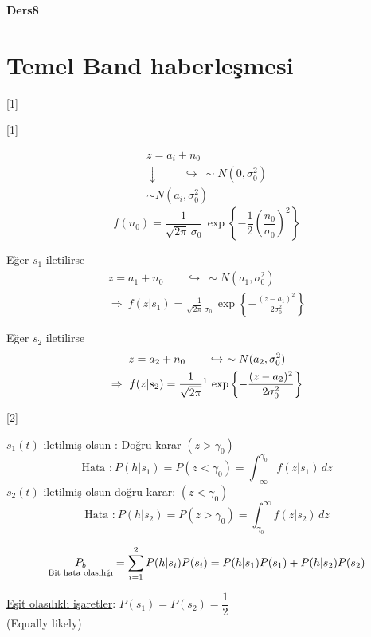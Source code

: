\documentclass[11pt,a4paper]{article}
\begin{document}

\textbf{Ders8}

\section{Temel Band haberleşmesi}
[1]

[1]

\[
\begin{array}{l}
z = a_i + n_0 \\
\downarrow \qquad\ \hookrightarrow\ \sim N(0,\sigma_0^2) \\
\sim N(a_i,\sigma_0^2)
\end{array}
\]
\[ f(n_0) = \frac{1}{\sqrt{2\pi}\,\sigma_0}\,\exp\left\{-\frac{1}{2}\left(\frac{n_0}{\sigma_0}\right)^2\right\} \]

Eğer $s_1$ iletilirse
\[
\begin{gathered}
z = a_1 + n_0 \qquad \hookrightarrow\ \sim N(a_1,\sigma_0^2) \\
\Rightarrow\ f(z|s_1)=\frac{1}{\sqrt{2\pi}\,\sigma_0}\,\exp\left\{-\frac{(z-a_1)^2}{2\sigma_0^2}\right\}
\end{gathered}
\]

Eğer $s_2$ iletilirse
\[
\begin{gathered}
z = a_2 + n_0 \qquad \hookrightarrow\ \sim N(a_2,\sigma_0^2) \\
\Rightarrow\ f(z|s_2)=\frac{1}{\sqrt{2\pi}}\footnotemark\,\exp\left\{-\frac{(z-a_2)^2}{2\sigma_0^2}\right\}
\end{gathered}
\]

[2]

$s_1(t)$ iletilmiş olsun : Doğru karar $(z>\gamma_0)$
\[ \text{Hata :}\ P(h|s_1)=P(z<\gamma_0)=\int_{-\infty}^{\gamma_0} f(z|s_1)\,dz \]
$s_2(t)$ iletilmiş olsun doğru karar: $(z<\gamma_0)$
\[ \text{Hata :}\ P(h|s_2)=P(z>\gamma_0)=\int_{\gamma_0}^{\infty} f(z|s_2)\,dz \]

\[ \underset{\text{\scriptsize Bit hata olasılığı}}{P_b}=\sum_{i=1}^{2}P(h|s_i)P(s_i)=P(h|s_1)P(s_1)+P(h|s_2)P(s_2) \]

\underline{Eşit olasılıklı işaretler}: $P(s_1)=P(s_2)=\dfrac{1}{2}$ \\
(Equally likely)
\end{document}
